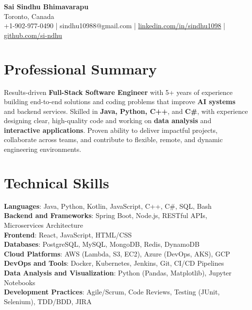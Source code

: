 \documentclass[letterpaper,11pt]{article}
\begin{document}
\begin{center}
  {\Large \textbf{Sai Sindhu Bhimavarapu}} \\
  Toronto, Canada \\
  +1-902-977-0490 \enspace | \enspace sindhu10988@gmail.com \enspace | \enspace \href{https://www.linkedin.com/in/sindhu1098/}{linkedin.com/in/sindhu1098} \enspace | \enspace \href{https://github.com/si-ndhu}{github.com/si-ndhu}
\end{center}

\section{Professional Summary}
  \begin{itemize}[leftmargin=0.15in, label={}]
    \small{\item{
     Results-driven \textbf{Full-Stack Software Engineer} with 5+ years of experience building end-to-end solutions and coding problems that improve \textbf{AI systems} and backend services. Skilled in \textbf{Java, Python, C++}, and \textbf{C\#}, with experience designing clear, high-quality code and working on \textbf{data analysis} and \textbf{interactive applications}. Proven ability to deliver impactful projects, collaborate across teams, and contribute to flexible, remote, and dynamic engineering environments.
    }}
  \end{itemize}
\vspace{-16pt}

\section{Technical Skills}
 \begin{itemize}[leftmargin=0.15in, label={}]
    \small{\item{
     \textbf{Languages}: Java, Python, Kotlin, JavaScript, C++, C\#, SQL, Bash \\
     \textbf{Backend and Frameworks}: Spring Boot, Node.js, RESTful APIs, Microservices Architecture \\
     \textbf{Frontend}: React, JavaScript, HTML/CSS \\
     \textbf{Databases}: PostgreSQL, MySQL, MongoDB, Redis, DynamoDB \\
     \textbf{Cloud Platforms}: AWS (Lambda, S3, EC2), Azure (DevOps, AKS), GCP \\
     \textbf{DevOps and Tools}: Docker, Kubernetes, Jenkins, Git, CI/CD Pipelines \\
     \textbf{Data Analysis and Visualization}: Python (Pandas, Matplotlib), Jupyter Notebooks \\
     \textbf{Development Practices}: Agile/Scrum, Code Reviews, Testing (JUnit, Selenium), TDD/BDD, JIRA
    }}
 \end{itemize}
\vspace{-16pt}
\end{document}
